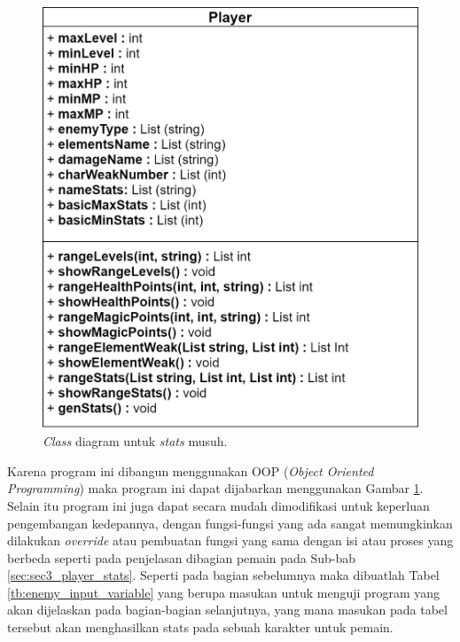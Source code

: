 \begin{figure} [!h] \centering
	\includegraphics[scale=0.25]{img/enemy_uml.png}
	\caption{\textit{Class} diagram untuk \textit{stats} musuh.}
	\label{fig:enemy_uml}
	\vspace{-1ex}
\end{figure}

Karena program ini dibangun menggunakan OOP (\textit{Object Oriented Programming}) maka program ini dapat dijabarkan menggunakan Gambar \ref{fig:enemy_uml}. Selain itu program ini juga dapat secara mudah dimodifikasi untuk keperluan pengembangan kedepannya, dengan fungsi-fungsi yang ada sangat memungkinkan dilakukan \textit{override} atau pembuatan fungsi yang sama dengan isi atau proses yang berbeda seperti pada penjelasan dibagian pemain pada Sub-bab \ref{sec:sec3_player_stats}. Seperti pada bagian sebelumnya maka dibuatlah Tabel \ref{tb:enemy_input_variable} yang berupa masukan untuk menguji program yang akan dijelaskan pada bagian-bagian selanjutnya, yang mana masukan pada tabel tersebut akan menghasilkan stats pada sebuah karakter untuk pemain.
\vspace{1ex}

